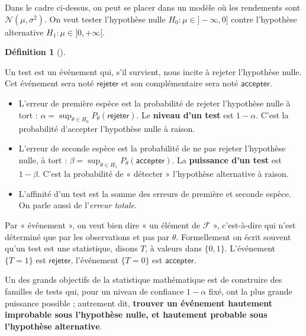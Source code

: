 \documentclass[
  10,
  letterpaper,
  DIV=11,
  numbers=noendperiod]{scrreport}
\theoremstyle{plain}
\theoremstyle{definition}
\theoremstyle{plain}
\theoremstyle{definition}
\newtheorem{definition}{Définition}[chapter]
\theoremstyle{definition}
\theoremstyle{plain}
\theoremstyle{remark}
\begin{document}
Dans le cadre ci-dessus, on peut se placer dans un modèle où les
rendements sont \(\mathscr{N}(\mu, \sigma^2)\). On veut tester
l'hypothèse nulle \(H_0 : \mu \in ]-\infty, 0]\) contre l'hypothèse
alternative \(H_1 : \mu \in ]0,+\infty[\).

\newcommand{\rejet}{\mathsf{rejeter}}
\newcommand{\accept}{\mathsf{accepter}}

\begin{definition}[]\protect\hypertarget{def-test}{}\label{def-test}

Un test est un événement qui, s'il survient, nous incite à rejeter
l'hypothèse nulle. Cet événement sera noté \(\mathsf{rejeter}\) et son
complémentaire sera noté \(\mathsf{accepter}\).

\begin{itemize}
\item
  L'erreur de première espèce est la probabilité de rejeter l'hypothèse
  nulle à tort :
  \(\alpha = \sup_{\theta \in H_0}P_\theta(\mathsf{rejeter})\). Le
  \textbf{niveau d'un test} est \(1-\alpha\). C'est la probabilité
  d'accepter l'hypothèse nulle à raison.
\item
  L'erreur de seconde espèce est la probabilité de ne pas rejeter
  l'hypothèse nulle, à tort :
  \(\beta = \sup_{\theta \in H_1}P_\theta(\mathsf{accepter})\). La
  \textbf{puissance d'un test} est \(1-\beta\). C'est la probabilité de
  « détecter » l'hypothèse alternative à raison.
\item
  L'affinité d'un test est la somme des erreurs de première et seconde
  espèce. On parle aussi de l'\emph{erreur totale}.
\end{itemize}

\end{definition}

Par « événement », on veut bien dire « un élément de \(\mathscr{F}\) »,
c'est-à-dire qui n'est déterminé que par les observations et pas par
\(\theta\). Formellement on écrit souvent qu'un test est une
statistique, disons \(T\), à valeurs dans \(\{0,1\}\). L'événement
\(\{T=1\}\) est \(\mathsf{rejeter}\), l'événement \(\{T=0\}\) est
\(\mathsf{accepter}\).

Un des grands objectifs de la statistique mathématique est de construire
des familles de tests qui, pour un niveau de confiance \(1-\alpha\)
fixé, ont la plus grande puissance possible ; autrement dit,
\textbf{trouver un événement hautement improbable sous l'hypothèse
nulle, et hautement probable sous l'hypothèse alternative}.
\end{document}
